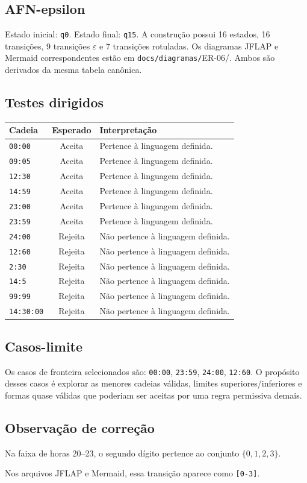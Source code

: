 \subsection{AFN-epsilon}
Estado inicial: \texttt{q0}. Estado final: \texttt{q15}. A construção possui 16 estados, 16 transições, 9 transições $\varepsilon$ e 7 transições rotuladas.
Os diagramas JFLAP e Mermaid correspondentes estão em \texttt{docs/diagramas/}ER-06/. Ambos são derivados da mesma tabela canônica.
\subsection{Testes dirigidos}
\begin{center}
\small
\begin{tabular}{|p{}|c|p{}|}
\toprule
Cadeia & Esperado & Interpretação \\
\midrule
\texttt{00:00} & Aceita & Pertence à linguagem definida. \\
\texttt{09:05} & Aceita & Pertence à linguagem definida. \\
\texttt{12:30} & Aceita & Pertence à linguagem definida. \\
\texttt{14:59} & Aceita & Pertence à linguagem definida. \\
\texttt{23:00} & Aceita & Pertence à linguagem definida. \\
\texttt{23:59} & Aceita & Pertence à linguagem definida. \\
\texttt{24:00} & Rejeita & Não pertence à linguagem definida. \\
\texttt{12:60} & Rejeita & Não pertence à linguagem definida. \\
\texttt{2:30} & Rejeita & Não pertence à linguagem definida. \\
\texttt{14:5} & Rejeita & Não pertence à linguagem definida. \\
\texttt{99:99} & Rejeita & Não pertence à linguagem definida. \\
\texttt{14:30:00} & Rejeita & Não pertence à linguagem definida. \\
\bottomrule
\end{tabular}
\end{center}
\subsection{Casos-limite}
Os casos de fronteira selecionados são: \texttt{00:00}, \texttt{23:59}, \texttt{24:00}, \texttt{12:60}.
\medskip
O propósito desses casos é explorar as menores cadeias válidas, limites superiores/inferiores e formas quase válidas que poderiam ser aceitas por uma regra permissiva demais.
\subsection{Observação de correção}
Na faixa de horas 20--23, o segundo dígito pertence ao conjunto \(\{0,1,2,3\}\).

Nos arquivos JFLAP e Mermaid, essa transição aparece como \texttt{[0-3]}. 
